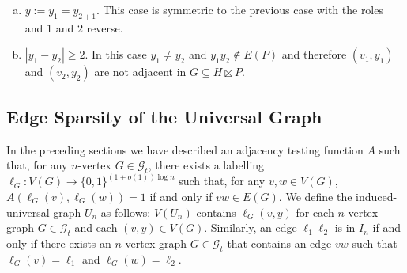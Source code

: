 \documentclass{patmorin}
\begin{document}
\begin{enumerate}
\begin{enumerate}[(a)]
        \item $y:=y_1=y_{2+1}$. This case is symmetric to the previous case with the roles and $1$ and $2$ reverse.

        \item $|y_1-y_2|\ge 2$.  In this case $y_1\neq y_2$ and $y_1y_2\not\in E(P)$ and therefore $(v_1,y_1)$ and $(v_2,y_2)$ are not adjacent in $G\subseteq H\boxtimes P$.
    \end{enumerate}
\end{enumerate}


\subsection{Edge Sparsity of the Universal Graph}

In the preceding sections we have described an adjacency testing function $A$ such that, for any $n$-vertex $G\in \mathcal{G}_t$, there exists a labelling $\ell_G:V(G)\to\{0,1\}^{(1+o(1))\log n}$ such that, for any $v,w\in V(G)$, $A(\ell_G(v),\ell_G(w))=1$ if and only if $vw\in E(G)$.  We define the induced-universal graph $U_n$ as follows: $V(U_n)$ contains $\ell_G(v,y)$ for each $n$-vertex graph $G\in\mathcal{G}_t$ and each $(v,y)\in V(G)$. Similarly, an edge $\ell_1\ell_2$ is in $I_n$ if and only if there exists an $n$-vertex graph $G\in\mathcal{G}_t$ that contains an edge $vw$ such that $\ell_G(v)=\ell_1$ and $\ell_G(w)=\ell_2$.
\end{document}
